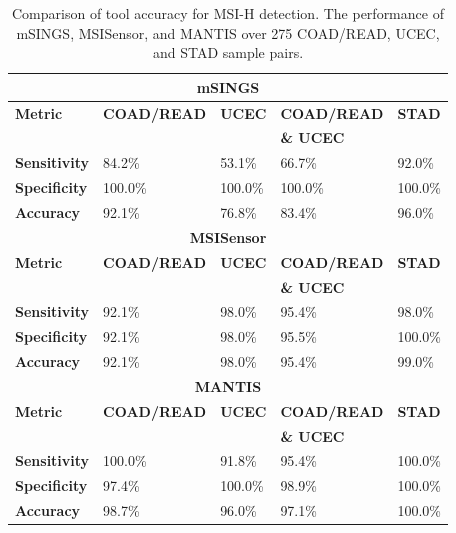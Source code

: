 \begin{table}[H]
	\begin{center}
		\begin{tabular}{l|l|l|l|l}
			\multicolumn{5}{c}{\textbf{mSINGS}} \\
			\hline
			\textbf{Metric} & \textbf{COAD/READ} & \textbf{UCEC} & \textbf{COAD/READ} & \textbf{STAD} \\
			& & & \textbf{\& UCEC} & \\
			\textbf{Sensitivity} & 84.2\% & 53.1\% & 66.7\% & 92.0\% \\
			\textbf{Specificity} & 100.0\% & 100.0\% & 100.0\% & 100.0\% \\
			\textbf{Accuracy} & 92.1\% & 76.8\% & 83.4\% & 96.0\% \\
			\hline\hline
			\multicolumn{5}{c}{\textbf{MSISensor}} \\
			\hline
			\textbf{Metric} & \textbf{COAD/READ} & \textbf{UCEC} & \textbf{COAD/READ} & \textbf{STAD} \\
			& & & \textbf{\& UCEC} & \\
			\textbf{Sensitivity} & 92.1\% & 98.0\% & 95.4\% & 98.0\% \\
			\textbf{Specificity} & 92.1\% & 98.0\% & 95.5\% & 100.0\% \\
			\textbf{Accuracy} & 92.1\% & 98.0\% & 95.4\% & 99.0\% \\
			\hline\hline
			\multicolumn{5}{c}{\textbf{MANTIS}} \\
			\hline
			\textbf{Metric} & \textbf{COAD/READ} & \textbf{UCEC} & \textbf{COAD/READ} & \textbf{STAD} \\
			& & & \textbf{\& UCEC} & \\
			\textbf{Sensitivity} & 100.0\% & 91.8\% & 95.4\% & 100.0\% \\
			\textbf{Specificity} & 97.4\% & 100.0\% & 98.9\% & 100.0\% \\
			\textbf{Accuracy} & 98.7\% & 96.0\% & 97.1\% & 100.0\% \\
			\hline\hline
		\end{tabular}
	\end{center}
	\vspace{-0.3cm}
	\caption[Comparison of tool accuracy for MSI-H detection.]{Comparison of tool accuracy for MSI-H detection. The performance of mSINGS, MSISensor, and MANTIS over 275 COAD/READ, UCEC, and STAD sample pairs.}
	\label{table:msilandscape:tool_accuracy}
\end{table}

